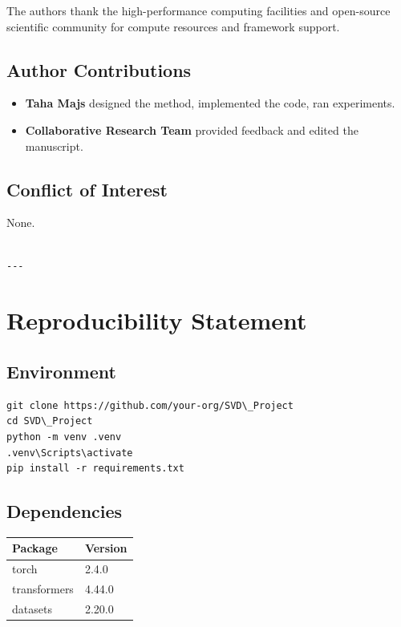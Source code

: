 The authors thank the high-performance computing facilities and open-source scientific community for compute resources and framework support.

\subsection{Author Contributions}

\begin{itemize}
\item \textbf{Taha Majs} designed the method, implemented the code, ran experiments.
\item \textbf{Collaborative Research Team} provided feedback and edited the manuscript.

\end{itemize}
\subsection{Conflict of Interest}

None.
\begin{lstlisting}

---
\end{lstlisting}

\section{Reproducibility Statement}

\subsection{Environment}

\begin{lstlisting}
git clone https://github.com/your-org/SVD\_Project
cd SVD\_Project
python -m venv .venv
.venv\Scripts\activate
pip install -r requirements.txt
\end{lstlisting}

\subsection{Dependencies}

\begin{table}[H]
\centering
\small
\begin{tabular}{ll}
\toprule
\textbf{Package} & \textbf{Version} \\
\midrule
torch & 2.4.0 \\
transformers & 4.44.0 \\
datasets & 2.20.0 \\
\bottomrule
\end{tabular}
\end{table}

